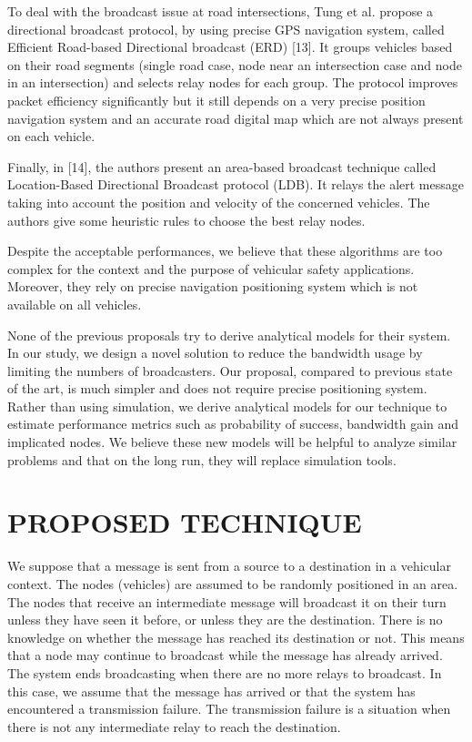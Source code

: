 \documentclass{IEEEtran}
\begin{document}
To deal with the broadcast issue at road intersections, Tung et al.
propose a directional broadcast protocol, by using precise GPS
navigation system, called Efficient Road-based Directional broadcast
(ERD) [13]. It groups vehicles based on their road segments (single
road case, node near an intersection case and node in an
intersection) and selects relay nodes for each group. The protocol
improves packet efficiency significantly but it still depends on a
very precise position navigation system and an accurate road digital
map which are not always present on each vehicle.

Finally, in [14], the authors present an area-based broadcast
technique called Location-Based Directional Broadcast protocol
(LDB). It relays the alert message taking into account the position
and velocity of the concerned vehicles. The authors give some
heuristic rules to choose the best relay nodes.

Despite the acceptable performances, we believe that these
algorithms are too complex for the context and the purpose of
vehicular safety applications. Moreover, they rely on precise
navigation positioning system which is not available on all
vehicles.

None of the previous proposals try to derive analytical models for
their system. In our study, we design a novel solution to reduce the
bandwidth usage by limiting the numbers of broadcasters. Our
proposal, compared to previous state of the art, is much simpler and
does not require precise positioning system. Rather than using
simulation, we derive analytical models for our technique to
estimate performance metrics such as probability of success,
bandwidth gain and implicated nodes. We believe these new models
will be helpful to analyze similar problems and that on the long
run, they will replace simulation tools.



\section{PROPOSED TECHNIQUE}

We suppose that a message is sent from a source to a destination in
a vehicular context. The nodes (vehicles) are assumed to be randomly
positioned in an area. The nodes that receive an intermediate
message will broadcast it on their turn unless they have seen it
before, or unless they are the destination. There is no knowledge on
whether the message has reached its destination or not. This means
that a node may continue to broadcast while the message has already
arrived. The system ends broadcasting when there are no more relays
to broadcast. In this case, we assume that the message has arrived
or that the system has encountered a transmission failure. The
transmission failure is a situation when there is not any
intermediate relay to reach the destination.
\end{document}
